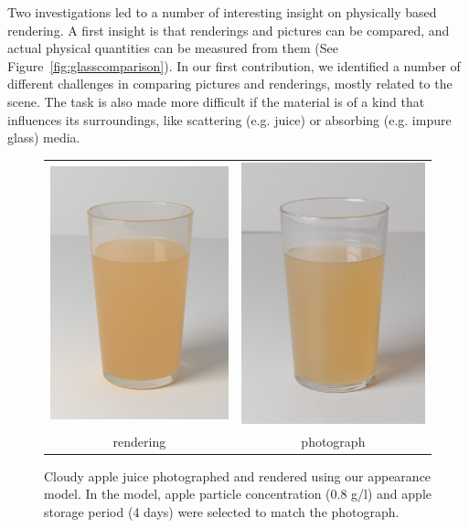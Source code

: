 Two investigations led to a number of interesting insight on physically based rendering. A first insight is that renderings and pictures can be compared, and actual physical quantities can be measured from them (See Figure~\ref{fig:glasscomparison}). In our first contribution, we identified a number of different challenges in comparing pictures and renderings, mostly related to the scene. The task is also made more difficult if the material is of a kind that influences its surroundings, like scattering (e.g. juice) or absorbing (e.g. impure glass) media. 

\begin{figure}
\begin{tabular}{@{}c@{}c@{}}
	 \includegraphics[width=0.5\columnwidth]{figures/teaser_render.png} &
	 \includegraphics[width=0.5\columnwidth]{figures/ref_img.jpg}  \\
	rendering & photograph \\
\end{tabular}
\caption{Cloudy apple juice photographed and rendered using our appearance model. In the model, apple particle concentration (0.8 g/l) and apple storage period (4 days) were selected to match the photograph.} %
\label{fig:juicecomparison}
\end{figure}

